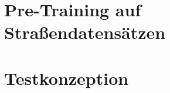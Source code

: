 \section{Pre-Training auf Straßendatensätzen} \label{sec:pre-training-roads}


\section{Testkonzeption}






